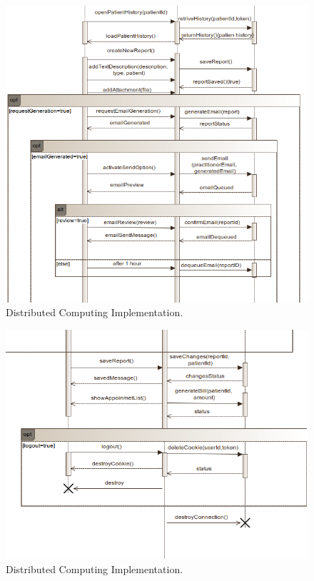\documentclass{article}
\begin{document}
            \begin{figure}[H]
                \centering 
                \includegraphics[width=1\linewidth]{./img/seq2.png}
                \caption{Distributed Computing Implementation.}
                \label{fig:architecture}
            \end{figure}
            \begin{figure}[H]
                \centering 
                \includegraphics[width=1\linewidth]{./img/seq3.png}
                \caption{Distributed Computing Implementation.}
                \label{fig:architecture}
            \end{figure}
\end{document}
